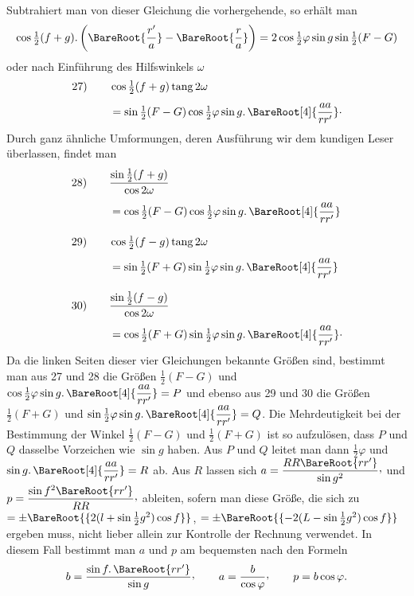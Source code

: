 Subtrahiert man von dieser Gleichung die vorhergehende, so erhält man
\[
\cos\tfrac12(f+g)\mathpunct{.}\left(\BareRoot{\dfrac{r'}{a}}-\BareRoot{\dfrac{r}{a}}\right)=2\cos\tfrac12\varphi\sin g\sin\tfrac12(F-G)
\]
oder nach Einführung des Hilfswinkels $\omega$
\[
\begin{aligned}
\mathrm{27)}\qquad &\cos\tfrac12(f+g)\operatorname{tang}2\omega\\[4pt]
&=\sin\tfrac12(F-G)\cos\tfrac12\varphi\sin g\mathpunct{.}\BareRoot[4]{\dfrac{aa}{rr'}}\mathpunct{\cdot}
\end{aligned}
\]
Durch ganz ähnliche Umformungen, deren Ausführung wir dem kundigen Leser überlassen, findet man
\[
\begin{aligned}
\mathrm{28)}\qquad &\dfrac{\sin\frac12(f+g)}{\cos 2\omega}\\[4pt]
&=\cos\tfrac12(F-G)\cos\tfrac12\varphi\sin g\mathpunct{.}\BareRoot[4]{\dfrac{aa}{rr'}}\\[8pt]
\mathrm{29)}\qquad &\cos\tfrac12(f-g)\operatorname{tang}2\omega\\[4pt]
&=\sin\tfrac12(F+G)\sin\tfrac12\varphi\sin g\mathpunct{.}\BareRoot[4]{\dfrac{aa}{rr'}}\\[8pt]
\mathrm{30)}\qquad &\dfrac{\sin\frac12(f-g)}{\cos 2\omega}\\[4pt]
&=\cos\tfrac12(F+G)\sin\tfrac12\varphi\sin g\mathpunct{.}\BareRoot[4]{\dfrac{aa}{rr'}}\mathpunct{\cdot}
\end{aligned}
\]
Da die linken Seiten dieser vier Gleichungen bekannte Größen sind, bestimmt man aus 27 und 28 die Größen $\frac12(F-G)$ und $\cos\frac12\varphi\sin g\mathpunct{.}\BareRoot[4]{\dfrac{aa}{rr'}}=P$ und ebenso aus 29 und 30 die Größen $\frac12(F+G)$ und $\sin\frac12\varphi\sin g\mathpunct{.}\BareRoot[4]{\dfrac{aa}{rr'}}=Q$. Die Mehrdeutigkeit bei der Bestimmung der Winkel $\frac12(F-G)$ und $\frac12(F+G)$ ist so aufzulösen, dass $P$ und $Q$ dasselbe Vorzeichen wie $\sin g$ haben. Aus $P$ und $Q$ leitet man dann $\frac12\varphi$ und $\sin g\mathpunct{.}\BareRoot[4]{\dfrac{aa}{rr'}}=R$ ab. Aus $R$ lassen sich $a=\dfrac{RR\BareRoot{rr'}}{\sin g^2}\mathpunct{\raisebox{.45ex}{,}}$ und $p=\dfrac{\sin f^2\BareRoot{rr'}}{RR}\mathpunct{\raisebox{.45ex}{,}}$ ableiten, sofern man diese Größe, die sich zu $=\pm\BareRoot{\{2(l+\sin\frac12 g^2)\cos f\}}$, $=\pm\BareRoot{\{-2(L-\sin\frac12 g^2)\cos f\}}$ ergeben muss, nicht lieber allein zur Kontrolle der Rechnung verwendet. In diesem Fall bestimmt man $a$ und $p$ am bequemsten nach den Formeln
\[
b=\dfrac{\sin f\mathpunct{.}\BareRoot{rr'}}{\sin g}\mathpunct{\raisebox{.45ex}{,}}\qquad a=\dfrac{b}{\cos\varphi}\mathpunct{\raisebox{.45ex}{,}}\qquad p=b\cos\varphi.
\]
